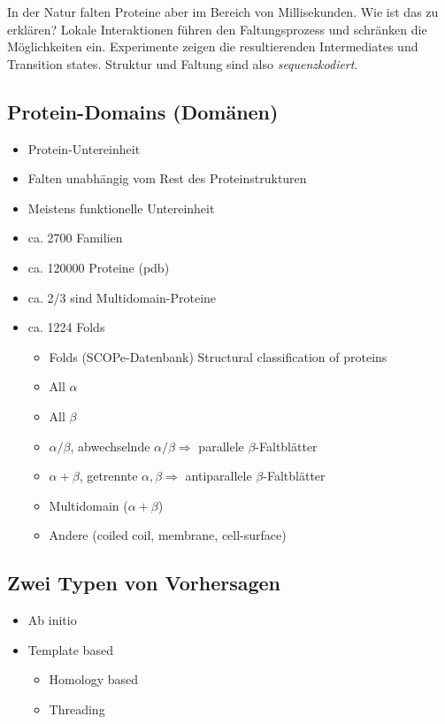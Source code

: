In der Natur falten Proteine aber im Bereich von Millisekunden. Wie ist das zu erklären?\newline
Lokale Interaktionen führen den Faltungsprozess und schränken die Möglichkeiten ein.
Experimente zeigen die resultierenden Intermediates und Transition states.\newline
Struktur und Faltung sind also \emph{sequenzkodiert}.
\subsection{Protein-Domains (Domänen)}
\begin{itemize}
 \item Protein-Untereinheit
 \item Falten unabhängig vom Rest des Proteinstrukturen
 \item Meistens funktionelle Untereinheit
 \item ca. 2700 Familien
 \item ca. 120000 Proteine (pdb)
 \item ca. 2/3 sind Multidomain-Proteine
 \item ca. 1224 Folds
 \begin{itemize}
  \item Folds (SCOPe-Datenbank) Structural classification of proteins
  \item All $\alpha$
  \item All $\beta$
  \item $\alpha / \beta$, abwechselnde $\alpha/ \beta \Rightarrow$ parallele $\beta$-Faltblätter
  \item $\alpha + \beta$, getrennte $\alpha, \beta \Rightarrow$ antiparallele $\beta$-Faltblätter
  \item Multidomain ($\alpha + \beta$)
  \item Andere (coiled coil, membrane, cell-surface)
  \end{itemize}
\end{itemize}
\subsection{Zwei Typen von Vorhersagen}
\begin{itemize}
 \item Ab initio
 \item Template based
 \begin{itemize}
  \item Homology based
  \item Threading
 \end{itemize}
\end{itemize}
